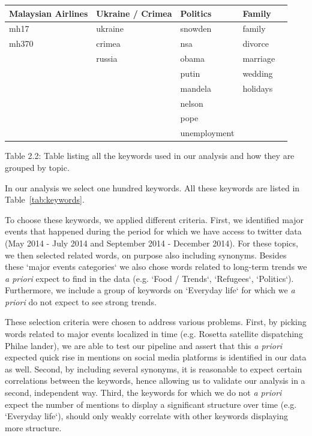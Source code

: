 \documentclass[12pt, a4paper]{article}
\begin{document}
\begin{center}
\begin{adjustbox}{max width=\textwidth}
\begin{tabular}{ | l | l | l | l | l | }
    Malaysian Airlines & Ukraine / Crimea & Politics & Family & \\ \hline
    mh17 & ukraine & snowden & family & \\
    mh370 & crimea & nsa & divorce & \\
     & russia & obama & marriage & \\
     &  & putin & wedding & \\
     &  & mandela & holidays & \\
     &  & nelson &  & \\
     &  & pope &  & \\
     &  & unemployment &  & \\
    \hline
    \end{tabular}
  \end{adjustbox}
  \caption{Table 2.2: Table listing all the keywords used in our analysis and how they are grouped by topic.}
\end{center}

In our analysis we select one hundred keywords. All these keywords are listed in Table~\ref{tab:keywords}.

To choose these keywords, we applied different criteria. First, we identified major events that happened during the period for which we have access to twitter data (May 2014 - July 2014 and September 2014 - December 2014). For these topics, we then selected related words, on purpose also including synonyms. Besides these `major events categories` we also chose words related to long-term trends we {\it a priori} expect to find in the data (e.g. `Food / Trends`, `Refugees`, `Politics`). Furthermore, we include a group of keywords on `Everyday life` for which we {\it a priori} do not expect to see strong trends.

These selection criteria were chosen to address various problems. First, by picking words related to major events localized in time (e.g. Rosetta satellite \cite{rosetta} dispatching Philae lander), we are able to test our pipeline and assert that this {\it a priori} expected quick rise in mentions on social media platforms is identified in our data as well. Second, by including several synonyms, it is reasonable to expect certain correlations between the keywords, hence allowing us to validate our analysis in a second, independent way. Third, the keywords for which we do not {\it a priori} expect the number of mentions to display a significant structure over time (e.g. `Everyday life`), should only weakly correlate with other keywords displaying more structure.
\end{document}
